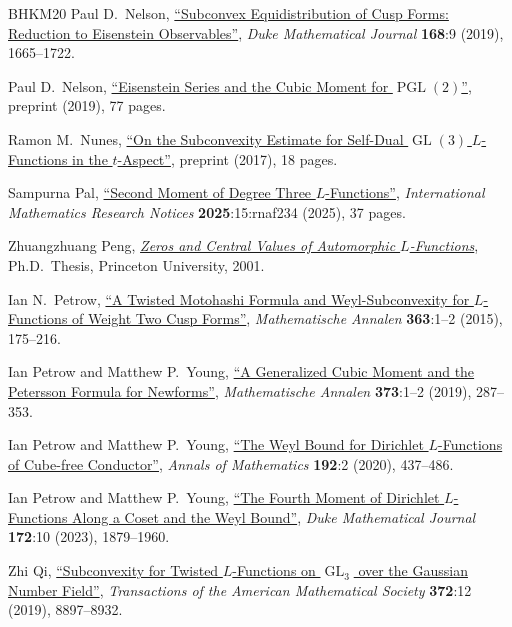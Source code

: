 \documentclass[11pt,a4paper]{amsart}
\DeclareMathOperator{\GL}{GL}
\DeclareMathOperator{\PGL}{PGL}
\numberwithin{equation}{section}
\theoremstyle{remark}
\theoremstyle{definition}
\begin{document}
\begin{thebibliography}{BHKM20}
 Paul D.~Nelson, \href{https://doi.org/10.1215/00127094-2019-0005}{``Subconvex Equidistribution of Cusp Forms: Reduction to Eisenstein Observables''}, \textit{Duke Mathematical Journal} \textbf{168}:9 (2019), 1665--1722.

 Paul D.~Nelson, \href{https://arxiv.org/abs/1911.06310v3}{``Eisenstein Series and the Cubic Moment for $\PGL(2)$''}, preprint (2019), 77 pages.

 Ramon M.~Nunes, \href{https://arxiv.org/abs/1703.04424v1}{``On the Subconvexity Estimate for Self-Dual $\GL(3)$ $L$-Functions in the $t$-Aspect''}, preprint (2017), 18 pages.

 Sampurna Pal, \href{https://doi.org/10.1093/imrn/rnaf234}{``Second Moment of Degree Three $L$-Functions''}, \textit{International Mathematics Research Notices} \textbf{2025}:15:rnaf234 (2025), 37 pages.

 Zhuangzhuang Peng, \href{https://www.proquest.com/docview/276446097/}{\textit{Zeros and Central Values of Automorphic $L$-Functions}}, Ph.D.~Thesis, Princeton University, 2001.

 Ian N.~Petrow, \href{https://doi.org/10.1007/s00208-014-1166-8}{``A Twisted Motohashi Formula and Weyl-Subconvexity for $L$-Functions of Weight Two Cusp Forms''}, \textit{Mathematische Annalen} \textbf{363}:1--2 (2015), 175--216.

 Ian Petrow and Matthew P.~Young, \href{https://doi.org/10.1007/s00208-018-1745-1}{``A Generalized Cubic Moment and the Petersson Formula for Newforms''}, \textit{Mathematische Annalen} \textbf{373}:1--2 (2019), 287--353.

 Ian Petrow and Matthew P.~Young, \href{https://doi.org/10.4007/annals.2020.192.2.3}{``The Weyl Bound for Dirichlet $L$-Functions of Cube-free Conductor''}, \textit{Annals of Mathematics} \textbf{192}:2 (2020), 437--486.

 Ian Petrow and Matthew P.~Young, \href{https://doi.org/10.1215/00127094-2022-0069}{``The Fourth Moment of Dirichlet $L$-Functions Along a Coset and the Weyl Bound''}, \textit{Duke Mathematical Journal} \textbf{172}:10 (2023), 1879--1960.

 Zhi Qi, \href{https://doi.org/10.1090/tran/7892}{``Subconvexity for Twisted $L$-Functions on $\GL_3$ over the Gaussian Number Field''}, \textit{Transactions of the American Mathematical Society} \textbf{372}:12 (2019), 8897--8932.


\end{thebibliography}
\end{document}

